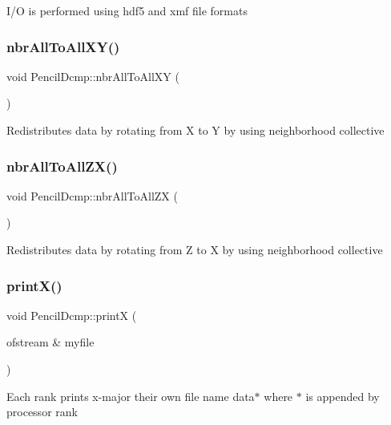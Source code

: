 I/O is performed using hdf5 and xmf file formats \mbox{\label{classPencilDcmp_a5a6415c2ca9d9bf54009ccfd252a76e5}} 
\subsubsection{\texorpdfstring{nbr\+All\+To\+All\+X\+Y()}{nbrAllToAllXY()}}
{\footnotesize\ttfamily void Pencil\+Dcmp\+::nbr\+All\+To\+All\+XY (\begin{DoxyParamCaption}{ }\end{DoxyParamCaption})}

Redistributes data by rotating from X to Y by using neighborhood collective \mbox{\label{classPencilDcmp_a06651ef577567ce90c4f7ad4d8fadf58}} 
\subsubsection{\texorpdfstring{nbr\+All\+To\+All\+Z\+X()}{nbrAllToAllZX()}}
{\footnotesize\ttfamily void Pencil\+Dcmp\+::nbr\+All\+To\+All\+ZX (\begin{DoxyParamCaption}{ }\end{DoxyParamCaption})}

Redistributes data by rotating from Z to X by using neighborhood collective \mbox{\label{classPencilDcmp_acf7d6672a7fdc141bfba205b27fb9d84}} 
\subsubsection{\texorpdfstring{print\+X()}{printX()}}
{\footnotesize\ttfamily void Pencil\+Dcmp\+::printX (\begin{DoxyParamCaption}\item[{ofstream \&}]{myfile }\end{DoxyParamCaption})}

Each rank prints x-\/major their own file name data$\ast$ where \textquotesingle{}$\ast$\textquotesingle{} is appended by processor rank \mbox{\label{classPencilDcmp_af19e8faec61ef717c742af90faa2c40c}} 

